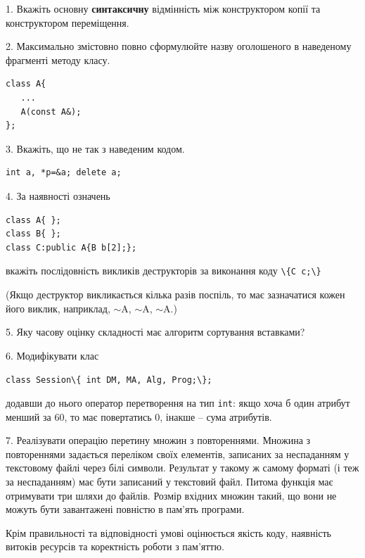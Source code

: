 \documentclass[12pt, ukrainian]{article}
\def\code#1{\Verb!#1!}
\begin{document}
{%
1. Вкажіть основну \textbf{синтаксичну} відмінність між конструктором копії та конструктором переміщення.%
\par
\vspace{2mm}
2. Максимально змістовно повно сформулюйте назву оголошеного в наведеному фрагменті методу класу.
\vspace{-3mm}
\begin{verbatim}class A{
   ...
   A(const A&);
};\end{verbatim}
\vspace{-3mm}
\par
\vspace{2mm}
3. Вкажіть, що не так з наведеним кодом.
\vspace{-3mm}
\begin{verbatim}int a, *p=&a; delete a;\end{verbatim}
\vspace{-3mm}
\par
\vspace{2mm}
4. За наявності означень
\vspace{-3mm}
\begin{verbatim}
class A{ };
class B{ };
class C:public A{B b[2];};\end{verbatim}
\vspace{-3mm}
вкажіть послідовність викликів деструкторів за виконання коду \code{\{C c;\}} 

(Якщо деструктор викликається кілька разів поспіль, то має зазначатися кожен його виклик, наприклад, $\sim$A, $\sim$A, $\sim$A.)

\vspace{2mm}
5. Яку часову оцінку складності має алгоритм сортування вставками?
\par
\vspace{2mm}
6. Модифікувати клас 

\qquad\code{class Session\{ int DM, MA, Alg, Prog;\};} 


додавши до нього оператор перетворення на тип \code{int}: якщо хоча б один атрибут менший за 60, то має повертатись 0, інакше -- сума атрибутів.%
\par
\vspace{2mm}
7. 
Реалізувати операцію перетину множин з повтореннями. Множина з повтореннями задається переліком своїх елементів, записаних за неспаданням у текстовому файлі через білі символи. Результат у такому ж самому форматі (і теж за неспаданням) має бути записаний у текстовий файл. Питома функція має отримувати три шляхи до файлів. Розмір вхідних множин такий, що вони не можуть бути завантажені повністю в пам’ять програми.

Крім правильності та відповідності умові оцінюється якість коду, наявність витоків ресурсів та коректність роботи з пам'яттю. 

}
\end{document}
